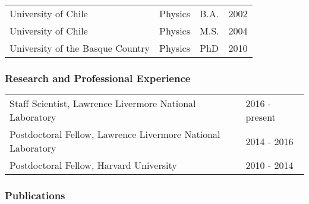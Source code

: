 \begin{table}[ht]
    \centering
    \begin{tabular}{llll}
        University of Chile & Physics & B.A. & 2002  \\
        University of Chile & Physics & M.S. & 2004 \\
        University of the Basque Country & Physics & PhD & 2010\\
    \end{tabular}
\end{table}

\subsubsection*{Research and Professional Experience}

\begin{table}[ht]
    \centering
    \begin{tabular}{ll}
Staff Scientist, Lawrence Livermore National Laboratory &       2016 - present   \\
Postdoctoral Fellow, Lawrence Livermore National Laboratory     &  2014 - 2016   \\
Postdoctoral Fellow, Harvard University &       2010 - 2014 \\
    \end{tabular}
\end{table}

\subsubsection*{Publications}

